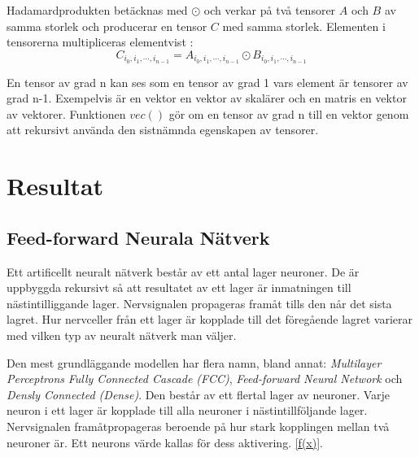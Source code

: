 \documentclass[a4paper,11pt,twoside]{article}
\begin{document}
Hadamardprodukten betäcknas med $\odot$ och verkar på två tensorer $A$ och $B$ av samma storlek och producerar en tensor $C$ med samma storlek.\cite{cs231n} Elementen i tensorerna multipliceras elementvist : 
\begin{equation}
	C_{i_0, i_1, \cdots, i_{n-1}} = A_{i_0, i_1, \cdots, i_{n-1}} \odot B_{i_0, i_1, \cdots, i_{n-1}}
\end{equation}

En tensor av grad n kan ses som en tensor av grad 1 vars element är tensorer av grad n-1. Exempelvis är en vektor en vektor av skalärer och en matris en vektor av vektorer. Funktionen $vec()$ gör om en tensor av grad n till en vektor genom att rekursivt använda den sistnämnda egenskapen av tensorer. \cite{convmath}

\section{Resultat}
\subsection{Feed-forward Neurala Nätverk}
Ett artificellt neuralt nätverk består av ett antal lager neuroner. De är uppbyggda rekursivt så att resultatet av ett lager är inmatningen till nästintilliggande lager. Nervsignalen propageras framåt tills den når det sista lagret. Hur nervceller från ett lager är kopplade till det föregående lagret varierar med vilken typ av neuralt nätverk man väljer. \cite{cs231n}

Den mest grundläggande modellen har flera namn, bland annat:  \textit{Multilayer Perceptrons} \textit{Fully Connected Cascade (FCC)}, \textit{Feed-forward Neural Network} och \textit{Densly Connected (Dense)}. Den består av ett flertal lager av neuroner. Varje neuron i ett lager är kopplade till alla neuroner i nästintillföljande lager. Nervsignalen framåtpropageras beroende på hur stark kopplingen mellan två neuroner är. Ett neurons värde kallas för dess aktivering. \eqref{f(x)}. \cite{cs231n}

\end{document}
